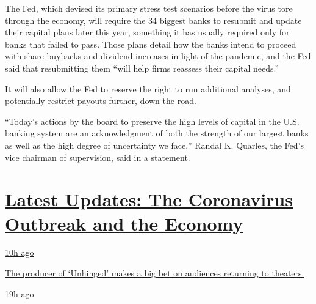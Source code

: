 The Fed, which devised its primary stress test scenarios before the
virus tore through the economy, will require the 34 biggest banks to
resubmit and update their capital plans later this year, something it
has usually required only for banks that failed to pass. Those plans
detail how the banks intend to proceed with share buybacks and dividend
increases in light of the pandemic, and the Fed said that resubmitting
them ``will help firms reassess their capital needs.''

It will also allow the Fed to reserve the right to run additional
analyses, and potentially restrict payouts further, down the road.

``Today's actions by the board to preserve the high levels of capital in
the U.S. banking system are an acknowledgment of both the strength of
our largest banks as well as the high degree of uncertainty we face,''
Randal K. Quarles, the Fed's vice chairman of supervision, said in a
statement.

\hypertarget{latest-updates-the-coronavirus-outbreak-and-the-economy}{%
\section{\texorpdfstring{\href{https://www.nytimes3xbfgragh.onion/live/2020/08/20/business/stock-market-today-coronavirus?action=click\&pgtype=Article\&state=default\&region=MAIN_CONTENT_1\&context=storylines_live_updates}{Latest
Updates: The Coronavirus Outbreak and the
Economy}}{Latest Updates: The Coronavirus Outbreak and the Economy}}\label{latest-updates-the-coronavirus-outbreak-and-the-economy}}

\href{https://www.nytimes3xbfgragh.onion/live/2020/08/20/business/stock-market-today-coronavirus?action=click\&pgtype=Article\&state=default\&region=MAIN_CONTENT_1\&context=storylines_live_updates\#the-producer-of-unhinged-makes-a-big-bet-on-audiences-returning-to-theaters}{10h
ago}

\href{https://www.nytimes3xbfgragh.onion/live/2020/08/20/business/stock-market-today-coronavirus?action=click\&pgtype=Article\&state=default\&region=MAIN_CONTENT_1\&context=storylines_live_updates\#the-producer-of-unhinged-makes-a-big-bet-on-audiences-returning-to-theaters}{The
producer of `Unhinged' makes a big bet on audiences returning to
theaters.}

\href{https://www.nytimes3xbfgragh.onion/live/2020/08/20/business/stock-market-today-coronavirus?action=click\&pgtype=Article\&state=default\&region=MAIN_CONTENT_1\&context=storylines_live_updates\#american-airlines-to-stop-flights-to-15-cities-after-government-aid-ends}{19h
ago}

